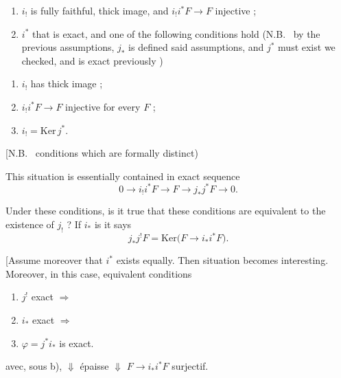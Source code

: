 \documentclass[11pt,a4paper]{article}
\begin{document}
\begin{enumerate}
\item[a)] $i_{!}$ is fully faithful, thick image, and $i_{!} i^{*} F \to F$
      injective ;
\item[b)] $i^{*}$  that is exact, and one
      of the following conditions hold (N.B.\ \ill{} by the previous
      assumptions, $j_{*}$ is defined \ill{} said assumptions, and $j^{*}$
      \ill{} must exist \ill{} we checked, and is exact previously \ill{})
\end{enumerate}

\begin{enumerate}
\item[$\alpha$)] $i_{!}$ \struck{\ill{}} has thick image ;
\item[$\beta$)] $i_{!} i^{*} F \to F$ injective for every $F$ ;
\item[$\delta$)] $i_{!} = \mathrm{Ker}\, j^{*}$.
\end{enumerate}

[N.B.\  \struck{\ill{}} conditions which are formally
distinct)

This situation is essentially contained in  exact sequence
\[
  0 \longrightarrow i_{!} i^{*} F \longrightarrow F \longrightarrow
  j_{*} j^{*} F \longrightarrow 0 .
\]

Under these conditions, is it true that these conditions \ill{} are equivalent
to the existence of $j_{!}$ \ill{} ? If $i_{*}$ is \ill{} \struck{\ill{}} it
says
\[
  j_{*} j^{!} F = \mathrm{Ker}\bigl(F \longrightarrow i_{*} i^{*} F\bigr) .
\]
\ill{}



[Assume moreover that $i^{*}$ exists equally. Then \ill{} situation becomes
interesting. Moreover, in this case, \struck{\ill{}} equivalent conditions
\begin{enumerate}
\item[a)] $j^{!}$ exact $\Longrightarrow$
\item[b)] $i_{*}$ exact $\Longrightarrow$
\item[c)] $\varphi = j^{*} i_{*}$ is exact.
\end{enumerate}
avec, sous b), $\Downarrow$   épaisse
$\Downarrow$ $F \to i_{*} i^{*} F$ surjectif.

\end{document}
